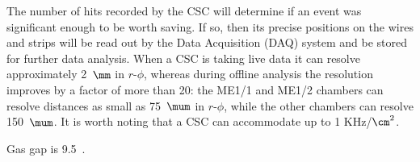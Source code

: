 The number of hits recorded by the CSC will determine if an event was significant enough to be worth saving.
If so, then its precise positions on the wires and strips will be read out by the Data Acquisition (DAQ) system and be stored for further data analysis.
When a CSC is taking live data it can resolve approximately 2~$\mm$ in $r$-$\phi$, whereas during offline analysis the resolution improves by a factor of more than 20:
the ME1/1 and ME1/2 chambers can resolve distances as small as 75~$\mum$ in $r$-$\phi$, while the other chambers can resolve 150~$\mum$.
It is worth noting that a CSC can accommodate up to 1 KHz/$\cm^2$.


Gas gap is 9.5~\mm.






